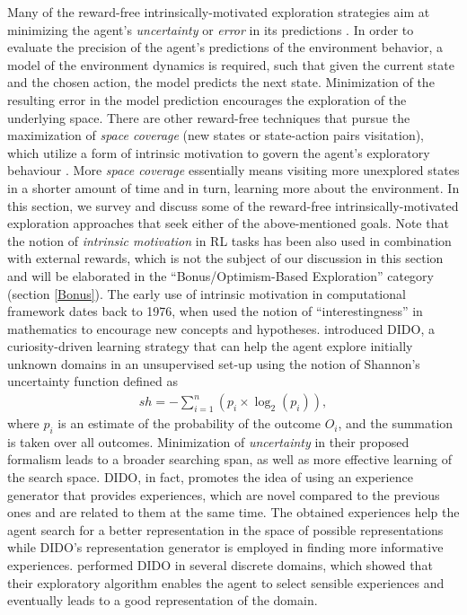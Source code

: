 Many of the reward-free intrinsically-motivated exploration strategies aim at minimizing the agent's \emph{uncertainty} or \emph{error} in its predictions . In order to evaluate the precision of the agent's predictions of the environment behavior, a model of the environment dynamics is required, such that given the current state and the chosen action, the model predicts the next state. Minimization of the resulting error in the model prediction encourages the exploration of the underlying space. There are other reward-free techniques that pursue the maximization of \emph{space coverage} (new states or state-action pairs visitation), which utilize a form of intrinsic motivation to govern the agent's exploratory behaviour . More \emph{space coverage} essentially means visiting more unexplored states in a shorter amount of time and in turn, learning more about the environment. In this section, we survey and discuss some of the reward-free intrinsically-motivated exploration approaches that seek either of the above-mentioned goals. Note that the notion of \emph{intrinsic motivation} in RL tasks has been also used in combination with external rewards, which is not the subject of our discussion in this section and will be elaborated in the ``Bonus/Optimism-Based Exploration'' category (section \ref{Bonus}). 
The early use of intrinsic motivation in computational framework dates back to 1976, when  used the notion of ``interestingness'' in mathematics to encourage new concepts and hypotheses.  introduced DIDO, a curiosity-driven learning strategy that can help the agent explore initially unknown domains in an unsupervised set-up using the notion of Shannon's uncertainty function defined as
\begin{align}
sh = -\sum_{i=1}^n\left(p_i\times\log_2(p_i)\right),
\end{align}
where $p_i$ is an estimate of the probability of the outcome $O_i$, and the summation is taken over all outcomes. Minimization of \emph{uncertainty} in their proposed formalism leads to a broader searching span, as well as more effective learning of the search space. DIDO, in fact, promotes the idea of using an experience generator that provides experiences, which are novel compared to the previous ones and are related to them at the same time. The obtained experiences help the agent search for a better representation in the space of possible representations while DIDO's representation generator is employed in finding more informative experiences.  performed DIDO in several discrete domains, which showed that their exploratory algorithm enables the agent to select sensible experiences and eventually leads to a good representation of the domain. 
